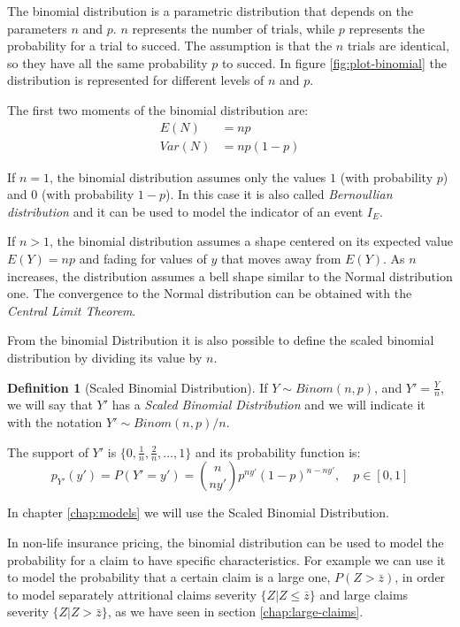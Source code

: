 \documentclass[a4paper, nobind]{templates/ociamthesis}
\theoremstyle{definition}
\newtheorem{definition}{Definition}[chapter]
\theoremstyle{definition}
\theoremstyle{definition}
\theoremstyle{remark}
\begin{document}
The binomial distribution is a parametric distribution that depends on the parameters \(n\) and \(p\). \(n\) represents the number of trials, while \(p\) represents the probability for a trial to succed. The assumption is that the \(n\) trials are identical, so they have all the same probability \(p\) to succed. In figure \ref{fig:plot-binomial} the distribution is represented for different levels of \(n\) and \(p\).

The first two moments of the binomial distribution are:
\begin{align*}
E(N)   & = np \\
Var(N) & = np(1-p)
\end{align*}

If \(n = 1\), the binomial distribution assumes only the values \(1\) (with probability \(p\)) and \(0\) (with probability \(1-p\)). In this case it is also called \emph{Bernoullian distribution} and it can be used to model the indicator of an event \(I_E\).

If \(n>1\), the binomial distribution assumes a shape centered on its expected value \(E(Y)=np\) and fading for values of \(y\) that moves away from \(E(Y)\). As \(n\) increases, the distribution assumes a bell shape similar to the Normal distribution one. The convergence to the Normal distribution can be obtained with the \emph{Central Limit Theorem}.

From the binomial Distribution it is also possible to define the scaled binomial distribution by dividing its value by \(n\).

\begin{definition}[Scaled Binomial Distribution]
\label{def:def-scaled-binomial} \iffalse (Scaled Binomial Distribution) \fi{} If \(Y\sim Binom(n, p)\), and \(Y' = \frac{Y}{n}\), we will say that \(Y'\) has a \textit{Scaled Binomial Distribution} and we will indicate it with the notation \(Y' \sim Binom(n, p)/n\).

The support of \(Y'\) is \(\{0, \frac{1}{n}, \frac{2}{n}, \dots, 1 \}\) and its probability function is:
\[
p_{Y'}(y') = P\left( Y' = y' \right) = \binom{n}{ny'} p^{ny'} (1-p)^{n-ny'}, \quad p \in [0, 1]
\]
\end{definition}

In chapter \ref{chap:models} we will use the Scaled Binomial Distribution.

In non-life insurance pricing, the binomial distribution can be used to model the probability for a claim to have specific characteristics. For example we can use it to model the probability that a certain claim is a large one, \(P(Z>\bar{z})\), in order to model separately attritional claims severity \(\{Z|Z\le\bar{z}\}\) and large claims severity \(\{Z|Z>\bar{z}\}\), as we have seen in section \ref{chap:large-claims}.
\end{document}
